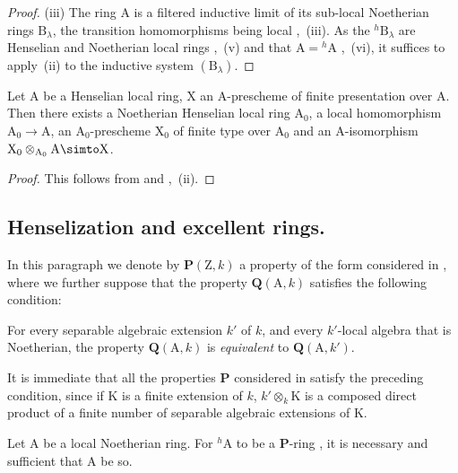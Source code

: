 \begin{proof}
(iii) The ring A is a filtered inductive limit of its sub-local Noetherian rings $\mathrm{B}_\lambda$, the transition homomorphisms being local ,~(iii).
As the ${}^h\!\mathrm{B}_\lambda$ are Henselian and Noetherian local rings ,~(v) and that $\mathrm{A}={}^h\!\mathrm{A}$ ,~(vi), it suffices to apply~(ii) to the inductive system $(\mathrm{B}_\lambda)$.
\end{proof}

\begin{corollary}[18.6.15]
\label{IV.18.6.15}
Let $\mathrm{A}$ be a Henselian local ring, $\mathrm{X}$ an A-prescheme of finite presentation over $\mathrm{A}$.
Then there exists a Noetherian Henselian local ring $\mathrm{A}_0$, a local homomorphism $\mathrm{A}_0\to\mathrm{A}$, an $\mathrm{A}_0$-prescheme $\mathrm{X}_0$ of finite type over $\mathrm{A}_0$ and an A-isomorphism $\mathrm{X}_0\otimes_{\mathrm{A}_0}\mathrm{A}\simto\mathrm{X}$.
\end{corollary}

\begin{proof}
This follows from  and ,~(ii).
\end{proof}


\subsection{Henselization and excellent rings.}
\label{subsection:IV.18.7}

\begin{env}[18.7.1]
\label{IV.18.7.1}
In this paragraph we denote by $\boldsymbol{P}(\mathrm{Z},k)$ a property of the form considered in , where we further suppose that the property $\boldsymbol{Q}(\mathrm{A},k)$ satisfies the following condition:

For every separable algebraic extension $k'$ of $k$, and every $k'$-local algebra that is Noetherian, the property $\boldsymbol{Q}(\mathrm{A},k)$ is \emph{equivalent} to $\boldsymbol{Q}(\mathrm{A},k')$.

It is immediate that all the properties $\boldsymbol{P}$ considered in  satisfy the preceding condition, since if K is a finite extension of $k$, $k'\otimes_k\mathrm{K}$ is a composed direct product of a finite number of separable algebraic extensions of K.
\end{env}

\begin{proposition}[18.7.2]
\label{IV.18.7.2}
Let $\mathrm{A}$ be a local Noetherian ring.
For ${}^h\!\mathrm{A}$ to be a $\boldsymbol{P}$-ring , it is necessary and sufficient that A be so.
\end{proposition}

